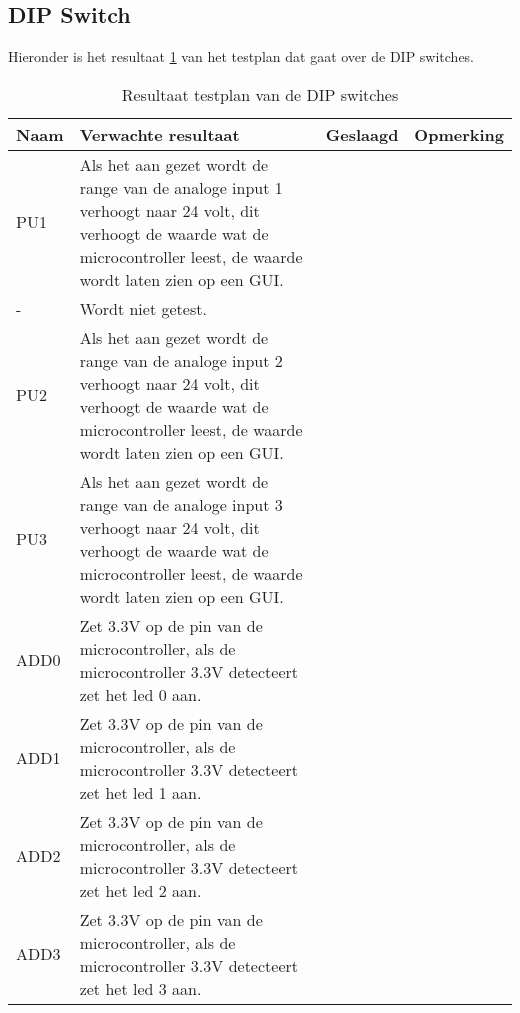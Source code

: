 \subsection{DIP Switch}
Hieronder is het resultaat \ref{tab:resultaatdip} van het testplan dat gaat over de DIP switches. 
\begin{table}[h!]
	\centering
	\caption{Resultaat testplan van de DIP switches}
	\begin{tabular}{lp{8.5cm}lp{4cm}}
	\toprule
	\textbf{Naam} 	& \textbf{Verwachte resultaat} & \textbf{Geslaagd} & \textbf{Opmerking}\\ \toprule
	PU1				& Als het aan gezet wordt de range van de analoge input 1 verhoogt naar 24 volt, dit verhoogt de waarde wat de microcontroller leest, de waarde wordt laten zien op een GUI. &\\
	-				& Wordt niet getest. & \\ 
	PU2				& Als het aan gezet wordt de range van de analoge input 2 verhoogt naar 24 volt, dit verhoogt de waarde wat de microcontroller leest, de waarde wordt laten zien op een GUI. &\\
	PU3				& Als het aan gezet wordt de range van de analoge input 3 verhoogt  naar 24 volt, dit verhoogt de waarde wat de microcontroller leest, de waarde wordt laten zien op een GUI. & \\
	ADD0 			& Zet 3.3V op de pin van de microcontroller, als de microcontroller 3.3V detecteert zet het led 0 aan. & \\
	ADD1 			& Zet 3.3V op de pin van de microcontroller, als de microcontroller 3.3V detecteert zet het led 1 aan. & \\
	ADD2 			& Zet 3.3V op de pin van de microcontroller, als de microcontroller 3.3V detecteert zet het led 2 aan. & \\
	ADD3 			& Zet 3.3V op de pin van de microcontroller, als de microcontroller 3.3V detecteert zet het led 3 aan. & \\ \bottomrule
	\end{tabular}
	\label{tab:resultaatdip}
\end{table}

\newpage
